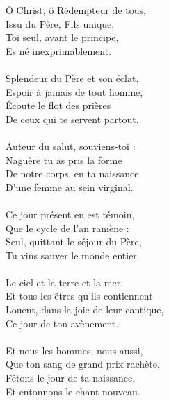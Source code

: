 Ô Christ, ô Rédempteur de tous,\\
Issu du Père, Fils unique,\\
Toi seul, avant le principe,\\
Es né inexprimablement.\\
\\
Splendeur du Père et son éclat,\\
Espoir à jamais de tout homme,\\
Écoute le flot des prières\\
De ceux qui te servent partout.\\
\\
Auteur du salut, souviens-toi :\\
Naguère tu as pris la forme\\
De notre corps, en ta naissance\\
D’une femme au sein virginal.\\
\\
Ce jour présent en est témoin,\\
Que le cycle de l’an ramène :\\
Seul, quittant le séjour du Père,\\
Tu vins sauver le monde entier.\\
\\
Le ciel et la terre et la mer\\
Et tous les êtres qu’ils contiennent\\
Louent, dans la joie de leur cantique,\\
Ce jour de ton avènement.\\
\\
Et nous les hommes, nous aussi,\\
Que ton sang de grand prix rachète,\\
Fêtons le jour de ta naissance,\\
Et entonnons le chant nouveau.